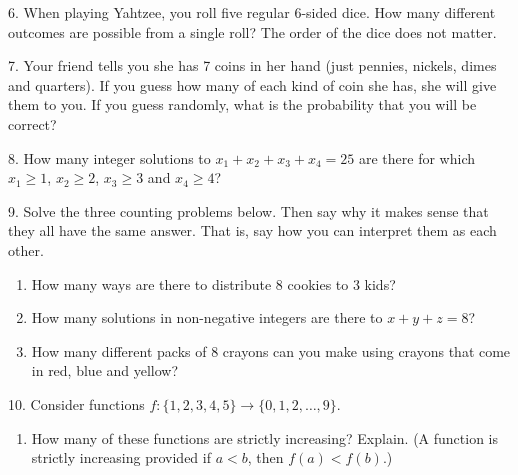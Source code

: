 \documentclass[10pt,]{book}
\theoremstyle{plain}
\theoremstyle{definition}
\numberwithin{equation}{chapter}
\newcommand{\lt}{ < }
\begin{document}
\begin{exerciselist}
\par\smallskip
\item[6.]\hypertarget{exercise-100}{}
                When playing Yahtzee, you roll five regular 6-sided dice. How many different outcomes are possible from a single roll? The order of the dice does not matter.
\par\smallskip
\item[7.]\hypertarget{exercise-101}{}
                Your friend tells you she has 7 coins in her hand (just pennies, nickels, dimes and quarters). If you guess how many of each kind of coin she has, she will give them to you. If you guess randomly, what is the probability that you will be correct?
\par\smallskip
\item[8.]\hypertarget{exercise-102}{}
                How many integer solutions to
                \(x_1 + x_2 + x_3 + x_4 = 25\)
                are there for which
                \(x_1 \ge 1\),
                \(x_2 \ge 2\),
                \(x_3 \ge 3\)
                and
                \(x_4 \ge 4\)?
\par\smallskip
\item[9.]\hypertarget{exercise-103}{}
                Solve the three counting problems below. Then say why it makes sense that they all have the same answer. That is, say how you can interpret them as each other.
            \leavevmode%
\begin{enumerate}[label=(\alph*)]
\item\hypertarget{li-341}{}
                        How many ways are there to distribute 8 cookies to 3 kids?
\item\hypertarget{li-342}{}
                        How many solutions in non-negative integers are there to
                        \(x+y+z = 8\)?
\item\hypertarget{li-343}{}
                        How many different packs of 8 crayons can you make using crayons that come in red, blue and yellow?
\end{enumerate}

\par\smallskip
\item[10.]\hypertarget{exercise-104}{}
          Consider functions \(f:\{1,2,3,4,5\} \to \{0,1,2,\ldots,9\}\).
        \leavevmode%
\begin{enumerate}[label=(\alph*)]
\item\hypertarget{li-344}{}
              How many of these functions are strictly increasing? Explain. (A function is strictly increasing provided if \(a \lt  b\), then \(f(a) \lt  f(b)\).)



\end{enumerate}
\end{exerciselist}
\end{document}
